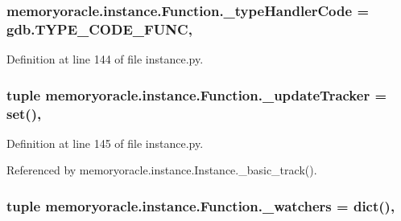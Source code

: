 \subsubsection[{\+\_\+type\+Handler\+Code}]{\setlength{\rightskip}{0pt plus 5cm}memoryoracle.\+instance.\+Function.\+\_\+type\+Handler\+Code = gdb.\+T\+Y\+P\+E\+\_\+\+C\+O\+D\+E\+\_\+\+F\+U\+N\+C\hspace{0.3cm}{\ttfamily [static]}, {\ttfamily [private]}}\label{classmemoryoracle_1_1instance_1_1Function_abc22bb1a3c502c21fb9bc5fc321b1fb1}


Definition at line 144 of file instance.\+py.

\hypertarget{classmemoryoracle_1_1instance_1_1Function_a1dca5163bcc7eef307b3815cd1442214}{}
\subsubsection[{\+\_\+update\+Tracker}]{\setlength{\rightskip}{0pt plus 5cm}tuple memoryoracle.\+instance.\+Function.\+\_\+update\+Tracker = set()\hspace{0.3cm}{\ttfamily [static]}, {\ttfamily [private]}}\label{classmemoryoracle_1_1instance_1_1Function_a1dca5163bcc7eef307b3815cd1442214}


Definition at line 145 of file instance.\+py.



Referenced by memoryoracle.\+instance.\+Instance.\+\_\+basic\+\_\+track().

\hypertarget{classmemoryoracle_1_1instance_1_1Function_a3ef013df70602c9cf0dcb8966d7eac99}{}
\subsubsection[{\+\_\+watchers}]{\setlength{\rightskip}{0pt plus 5cm}tuple memoryoracle.\+instance.\+Function.\+\_\+watchers = dict()\hspace{0.3cm}{\ttfamily [static]}, {\ttfamily [private]}}\label{classmemoryoracle_1_1instance_1_1Function_a3ef013df70602c9cf0dcb8966d7eac99}


